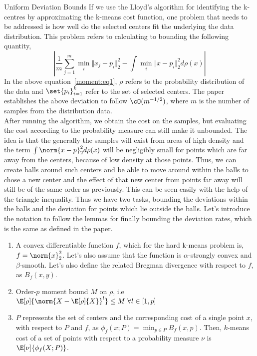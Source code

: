\documentclass[10pt]{article}
\begin{document}
\begin{psection}{Uniform Deviation Bounds}
    If we use the Lloyd's algorithm for identifying the k-centres by approximating the
    k-means cost function, one problem that needs to be addressed is how well do the
    selected centers fit the underlying the data distribution. This problem refers to
    calculating to bounding the following quantity,
    \begin{equation}
        \label{moment:eq1}
        \left\vert \frac{1}{m} \sum_{j=1}^m \min_i \Vert x_j - p_i \Vert^2_2 -\int \min_i \Vert x - p_i \Vert^2_2 d\rho(x)   \right\vert  
    \end{equation}
    In the above equation~\ref{moment:eq1}, $\rho$ refers to the probability
    distribution of the data and $\set{p_i}_{i=1}^{k}$ refer to the set of selected
    centers. The paper establishes the above deviation to follow $\cO (m^{-1/2})$, where
    $m$ is the number of samples from the distribution data. \\ After running the
    algorithm, we obtain the cost on the samples, but evaluating the cost according to
    the probability measure can still make it unbounded. The idea is that the generally
    the samples will exist from areas of high density and the term $\int \norm{x -
    p}^2_2 d\rho(x)$ will be negligibly small for points which are far away from the
    centers, because of low density at those points. Thus, we can create balls around
    such centers and be able to move around within the balls to chose a new center and
    the effect of that new center from points far away will still be of the same order
    as previously. This can be seen easily with the help of the triangle inequality.
    Thus we have two tasks, bounding the deviations within the balls and the deviation
    for points which lie outside the balls.  Let's introduce the notation to follow the
    lemmas for finally bounding the deviation rates, which is the same as defined in the
    paper.

    \begin{enumerate}
        \item A convex differentiable function $f$, which for the hard k-means problem
            is, $f= \norm{x}^2_2$. Let's also assume that the function is
            $\alpha$-strongly convex and $\beta$-smooth. Let's also define the related
            Bregman divergence with respect to $f$, as $B_f(x,y)$. 
        \item Order-$p$ moment bound $M$ on $\rho$, i.e
            $\E[\rho]{ \norm{X - \E[\rho]{X}}^l} \leq M \,\, \forall l \in [1,p]$
        \item $P$ represents the set of centers and the corresponding cost of a single
            point $x$, with respect to $P$ and $f$, as $\phi_f(x; P) = \min_{p \in P}
            B_f(x,p)$. Then, $k$-means cost of a set of points with respect to a
            probability measure $\nu$ is $\E[\nu]{\phi_f(X; P)}$.  
    \end{enumerate}


\end{psection}
\end{document}
